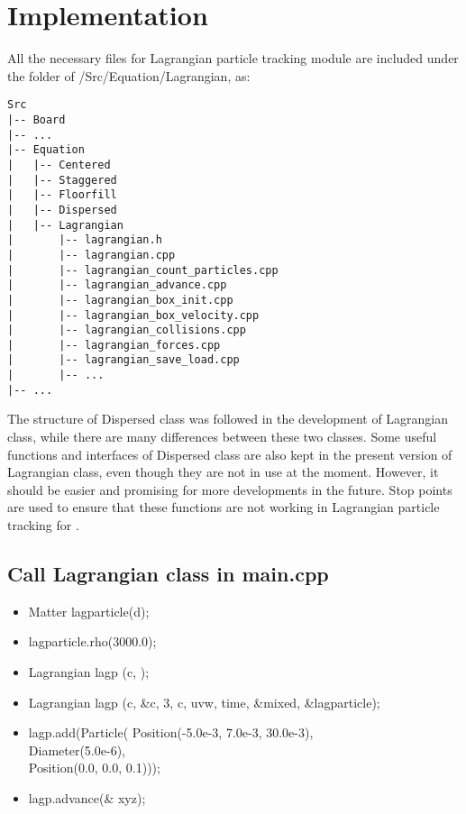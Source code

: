 \section{Implementation}

\label{sec_lptimplementation}

All the necessary files for Lagrangian particle tracking module are included under the folder of {\psiboil}/Src/Equation/Lagrangian, as:

%
{\small \begin{verbatim}
Src
|-- Board
|-- ...
|-- Equation
|   |-- Centered
|   |-- Staggered
|   |-- Floorfill
|   |-- Dispersed
|   |-- Lagrangian
|       |-- lagrangian.h
|       |-- lagrangian.cpp
|       |-- lagrangian_count_particles.cpp
|       |-- lagrangian_advance.cpp
|       |-- lagrangian_box_init.cpp
|       |-- lagrangian_box_velocity.cpp
|       |-- lagrangian_collisions.cpp
|       |-- lagrangian_forces.cpp
|       |-- lagrangian_save_load.cpp
|       |-- ...
|-- ...
\end{verbatim}}
%

The structure of Dispersed class was followed in the development of Lagrangian class, while there are many differences between these two classes.
Some useful functions and interfaces of Dispersed class are also kept in the present version of Lagrangian class, even though they are not in use at the moment.  However, it should be easier and promising for more developments in the future.
Stop points are used to ensure that these functions are not working in Lagrangian particle tracking for {\psiboil}.

\subsection{Call Lagrangian class in main.cpp}

\begin{itemize}
  \item {Matter lagparticle(d);}
  \item {lagparticle.rho(3000.0);}
  \item {Lagrangian lagp (c, );}
  \item {Lagrangian lagp (c, \&c, 3, c, uvw, time, \&mixed, \&lagparticle);}
  \item {\begin{flushleft}
             lagp.add(Particle( Position(-5.0e-3, 7.0e-3, 30.0e-3), \\
             \quad \quad \quad \quad Diameter(5.0e-6), \\
             \quad \quad \quad \quad Position(0.0, 0.0, 0.1)));
         \end{flushleft}}
  \item {lagp.advance(\& xyz);}
\end{itemize}
